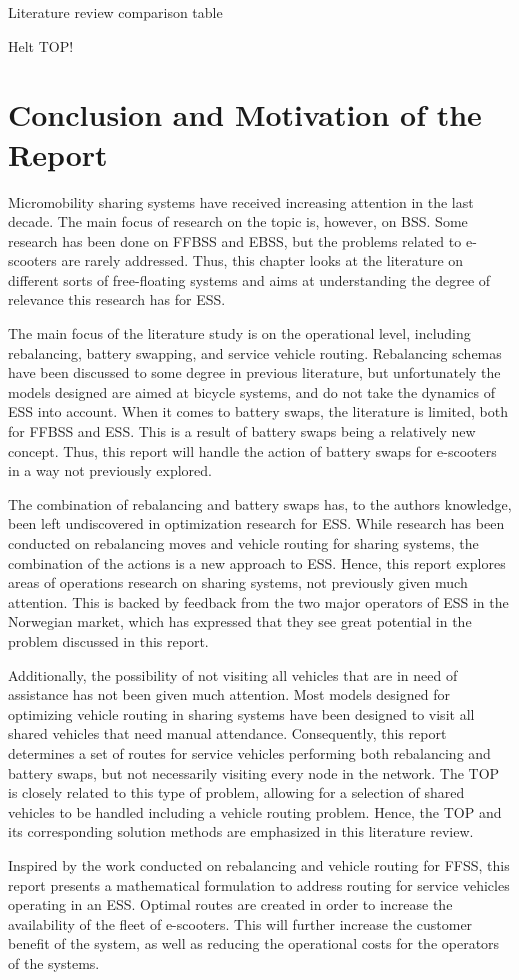 {Literature review comparison table}

Helt TOP!
\newpage
\setcounter{page}{25}

\section{Conclusion and Motivation of the Report} \label{Conclusion}

Micromobility sharing systems have received increasing attention in the last decade. The main focus of research on the topic is, however, on BSS. Some research has been done on FFBSS and EBSS, but the problems related to e-scooters are rarely addressed. Thus, this chapter looks at the literature on different sorts of free-floating systems and aims at understanding the degree of relevance this research has for ESS. 

The main focus of the literature study is on the operational level, including rebalancing, battery swapping, and service vehicle routing. Rebalancing schemas have been discussed to some degree in previous literature, but unfortunately the models designed are aimed at bicycle systems, and do not take the dynamics of ESS into account. When it comes to battery swaps, the literature is limited, both for FFBSS and ESS. This is a result of battery swaps being a relatively new concept. Thus, this report will handle the action of battery swaps for e-scooters in a way not previously explored.

The combination of rebalancing and battery swaps has, to the authors knowledge, been left undiscovered in optimization research for ESS. While research has been conducted on rebalancing moves and vehicle routing for sharing systems, the combination of the actions is a new approach to ESS. Hence, this report explores areas of operations research on sharing systems, not previously given much attention. This is backed by feedback from the two major operators of ESS in the Norwegian market, which has expressed that they see great potential in the problem discussed in this report. 

Additionally, the possibility of not visiting all vehicles that are in need of assistance has not been given much attention. Most models designed for optimizing vehicle routing in sharing systems have been designed to visit all shared vehicles that need manual attendance. Consequently, this report determines a set of routes for service vehicles performing both rebalancing and battery swaps, but not necessarily visiting every node in the network. The TOP is closely related to this type of problem, allowing for a selection of shared vehicles to be handled including a vehicle routing problem. Hence, the TOP and its corresponding solution methods are emphasized in this literature review.

Inspired by the work conducted on rebalancing and vehicle routing for FFSS, this report presents a mathematical formulation to address routing for service vehicles operating in an ESS. Optimal routes are created in order to increase the availability of the fleet of e-scooters. This will further increase the customer benefit of the system, as well as reducing the operational costs for the operators of the systems.  
